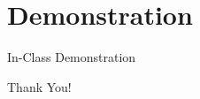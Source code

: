 \documentclass{beamer}
\theoremstyle{remark}
\begin{document}
\section{Demonstration}
\begin{frame}
    \begin{center}
        \Huge In-Class Demonstration
    \end{center}
\end{frame}

\begin{frame}
    \begin{center}
        \Huge Thank You!
    \end{center}
\end{frame}
\end{document}
